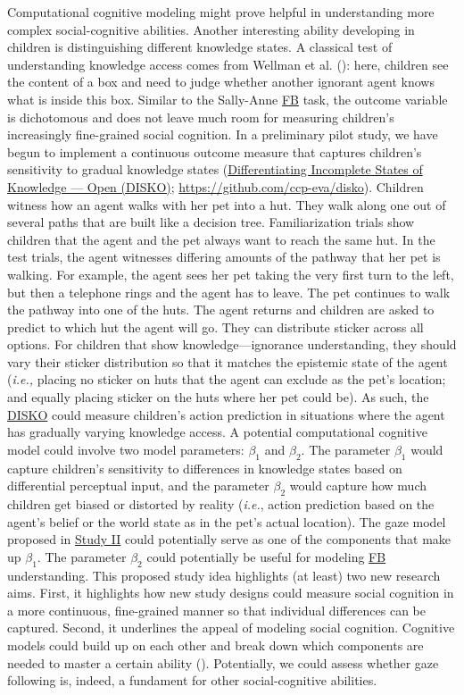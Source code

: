 \documentclass[
]{scrbook}
\begin{document}
Computational cognitive modeling might prove helpful in understanding more complex social-cognitive abilities. Another interesting ability developing in children is distinguishing different knowledge states. A classical test of understanding knowledge access comes from Wellman et al. (): here, children see the content of a box and need to judge whether another ignorant agent knows what is inside this box. Similar to the Sally-Anne \hyperref[acronyms_FB]{FB} task, the outcome variable is dichotomous and does not leave much room for measuring children's increasingly fine-grained social cognition. In a preliminary pilot study, we have begun to implement a continuous outcome measure that captures children's sensitivity to gradual knowledge states (\hyperref[acronyms_DISKO]{Differentiating Incomplete States of Knowledge --- Open (DISKO)}; \mbox{\url{https://github.com/ccp-eva/disko}}). Children witness how an agent walks with her pet into a hut. They walk along one out of several paths that are built like a decision tree. Familiarization trials show children that the agent and the pet always want to reach the same hut. In the test trials, the agent witnesses differing amounts of the pathway that her pet is walking. For example, the agent sees her pet taking the very first turn to the left, but then a telephone rings and the agent has to leave. The pet continues to walk the pathway into one of the huts. The agent returns and children are asked to predict to which hut the agent will go. They can distribute sticker across all options. For children that show knowledge---ignorance understanding, they should vary their sticker distribution so that it matches the epistemic state of the agent (\emph{i.e.,} placing no sticker on huts that the agent can exclude as the pet's location; and equally placing sticker on the huts where her pet could be). As such, the \hyperref[acronyms_DISKO]{DISKO} could measure children's action prediction in situations where the agent has gradually varying knowledge access. A potential computational cognitive model could involve two model parameters: \(\beta_1\) and \(\beta_2\). The parameter \(\beta_1\) would capture children's sensitivity to differences in knowledge states based on differential perceptual input, and the parameter \(\beta_2\) would capture how much children get biased or distorted by reality (\emph{i.e.}, action prediction based on the agent's belief or the world state as in the pet's actual location). The gaze model proposed in \hyperref[studyII]{Study II} could potentially serve as one of the components that make up \(\beta_1\). The parameter \(\beta_2\) could potentially be useful for modeling \hyperref[acronyms_FB]{FB} understanding. This proposed study idea highlights (at least) two new research aims. First, it highlights how new study designs could measure social cognition in a more continuous, fine-grained manner so that individual differences can be captured. Second, it underlines the appeal of modeling social cognition. Cognitive models could build up on each other and break down which components are needed to master a certain ability (). Potentially, we could assess whether gaze following is, indeed, a fundament for other social-cognitive abilities.
\end{document}
